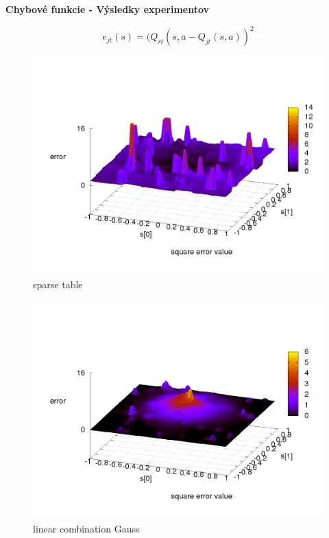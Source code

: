 \documentclass[xcolor=dvipsnames]{beamer}
\begin{document}
\begin{frame}{\bf Chybové funkcie - Výsledky experimentov}

\begin{equation}
e_{jt}(s) = (Q_{rt}(s,a - Q_{jt}(s,a))^2  \nonumber
\end{equation}

\begin{minipage}{.5\textwidth}

\begin{figure}[!htb]
\centering
\includegraphics[scale=.2]{../../results_q_learning/map_1/function_type_1/q_learning_error.png}
\caption{sparse table}
\end{figure}

\end{minipage}%
\begin{minipage}{.5\textwidth}

\begin{figure}[!htb]
\centering
\includegraphics[scale=.2]{../../results_q_learning/map_1/function_type_2/q_learning_error.png}
\caption{linear combination Gauss}
\end{figure}



\end{minipage}
\end{frame}
\end{document}
